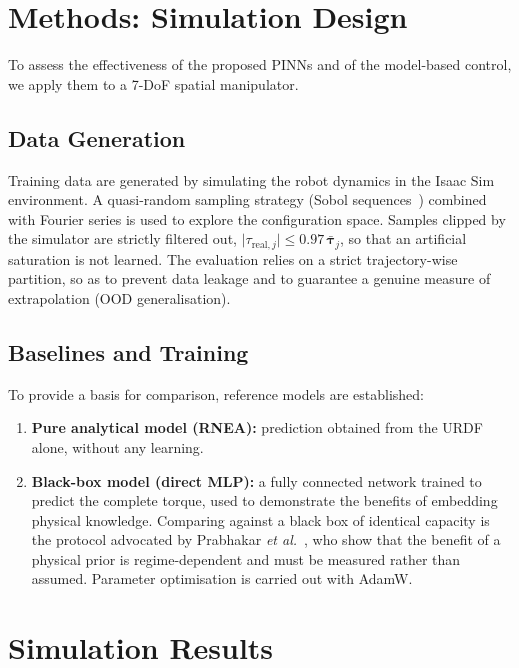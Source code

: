 \documentclass[a4paper, oneside]{article}
\begin{document}
\section{Methods: Simulation Design}
\label{sec-methodes}

To assess the effectiveness of the proposed PINNs and of the model-based control, we apply them to a 7-DoF spatial manipulator.

\subsection{Data Generation}
Training data are generated by simulating the robot dynamics in the Isaac Sim environment. A quasi-random sampling strategy (Sobol sequences~\cite{wang2024cac}) combined with Fourier series is used to explore the configuration space. Samples clipped by the simulator are strictly filtered out, $\bigl|\tau_{\mathrm{real},j}\bigr| \le \num{0.97}\,\bar{\boldsymbol{\tau}}_j$, so that an artificial saturation is not learned. The evaluation relies on a strict trajectory-wise partition, so as to prevent data leakage and to guarantee a genuine measure of extrapolation (OOD generalisation).

\subsection{Baselines and Training}
To provide a basis for comparison, reference models are established:
%
\begin{enumerate}
    \item \textbf{Pure analytical model (RNEA):} prediction obtained from the URDF alone, without any learning.
    \item \textbf{Black-box model (direct MLP):} a fully connected network trained to predict the complete torque, used to demonstrate the benefits of embedding physical knowledge. Comparing against a black box of identical capacity is the protocol advocated by Prabhakar \emph{et al.}~\cite{prabhakar2026}, who show that the benefit of a physical prior is regime-dependent and must be measured rather than assumed. Parameter optimisation is carried out with AdamW.
\end{enumerate}

\section{Simulation Results}
\label{sec-resultats-sim}
\end{document}
